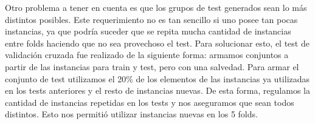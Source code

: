 Otro problema a tener en cuenta es que los grupos de test generados sean lo más distintos posibles. Este requerimiento no es tan sencillo si uno posee tan pocas instancias, ya que podría suceder que se repita mucha cantidad de instancias entre folds haciendo que no sea provechoso el test. Para solucionar esto, el test de validación cruzada fue realizado de la siguiente forma: armamos conjuntos a partir de las instancias para train y test, pero con una salvedad. Para armar el conjunto de test utilizamos el 20\% de los elementos de las instancias ya utilizadas en los tests anteriores y el resto de instancias nuevas. De esta forma, regulamos la cantidad de instancias repetidas en los tests y nos aseguramos que sean todos distintos. Esto nos permitió utilizar instancias nuevas en los 5 folds. 

